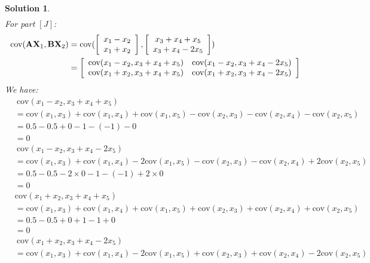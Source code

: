\documentclass[11pt]{article}\usepackage[]{graphicx}\usepackage[]{color}
\newtheorem{sol}{Solution}
\begin{document}
\begin{sol}
\begin{align*}
	\end{align*}
	For part $[J]$:
	\begin{align*}
		\text{cov}({\bf A}{\bf X}_1, {\bf B}{\bf X}_2) &= \text{cov}(\left[\begin{array}{c}x_1 - x_2\\x_1 + x_2 \end{array}\right], \left[\begin{array}{c}x_3 + x_4 + x_5\\ x_3 + x_4 - 2x_5\end{array}\right])\\
		&= \left[\begin{array}{cc} \text{cov}(x_1 - x_2, x_3 + x_4 + x_5)&\text{cov}(x_1 - x_2, x_3 + x_4 - 2x_5) \\ \text{cov}(x_1 + x_2, x_3+ x_4+ x_5)&\text{cov}(x_1 + x_2, x_3 + x_4 - 2x_5) \end{array}\right]
	\end{align*}
	We have:
	\begin{align*}
		&\ \text{cov}(x_1 - x_2, x_3 + x_4 + x_5) \\
		&= \text{cov}(x_1 ,x_3) +  \text{cov}(x_ 1,x_4) +  \text{cov}(x_ 1,x_5) -  \text{cov}(x_2 ,x_3) -  \text{cov}(x_2 ,x_4) -  \text{cov}(x_2,x_5)\\
		&= 0.5 - 0.5 + 0 - 1 - (-1) - 0\\
		&= 0
	\end{align*}
	\begin{align*}
		&\ \text{cov}(x_1 - x_2, x_3 + x_4 - 2x_5) \\
		&= \text{cov}(x_1 ,x_3 ) +  \text{cov}(x_1,x_4 ) - 2 \text{cov}(x_1 ,x_5 ) -  \text{cov}(x_2 ,x_3 )-  \text{cov}(x_2 ,x_4 ) +2 \text{cov}(x_2,x_5 )\\
		&= 0.5 - 0.5 - 2\times 0 - 1 - (-1) + 2\times 0\\
		&= 0
	\end{align*}
	\begin{align*}
		& \text{cov}(x_1 + x_2, x_3 + x_4+ x_5)\\
		&= \text{cov}(x_1 , x_3 )+\text{cov}(x_1 , x_4 ) + \text{cov}(x_1 , x_5 ) + \text{cov}(x_2 , x_3 )+  \text{cov}(x_2 , x_4 )+ \text{cov}(x_2 , x_5 )\\
		&= 0.5 - 0.5 + 0 + 1 - 1 + 0\\
		&= 0
	\end{align*}
	\begin{align*}	
	&\ \text{cov}(x_1 + x_2, x_3 + x_4 - 2x_5)\\
	&= \text{cov}(x_1 , x_3) + \text{cov}(x_1 , x_4) - 2\text{cov}(x_1 , x_5) + \text{cov}(x_2 , x_3) + \text{cov}(x_2 , x_4) - 2\text{cov}(x_2 , x_5)\\

\end{align*}
\end{sol}
\end{document}
